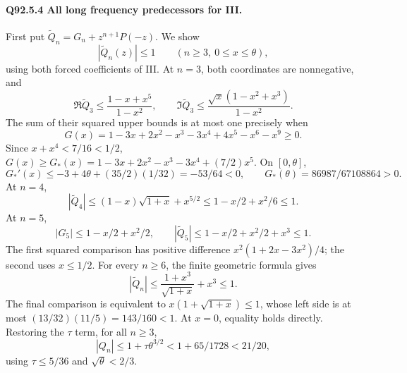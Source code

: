 \paragraph{Q92.5.4 All long frequency predecessors for III.}
First put \(\widetilde Q_n=\allowbreak G_n+z^{n+1}P(-z)\). We show
\begin{equation}\tag{Q92.5.13}\label{eq:Q92:5.13}
|\widetilde Q_n(z)|\le1\qquad(n\ge3,\ 0\le x\le\theta),
\end{equation}
using both forced coefficients of III.
At \(n=\allowbreak 3\), both coordinates are nonnegative, and
\begin{equation}\tag{Q92.5.14}\label{eq:Q92:5.14}
\Re\widetilde Q_3\le\frac{1-x+x^5}{1-x^2},\qquad
\Im\widetilde Q_3\le\frac{\sqrt x(1-x^2+x^3)}{1-x^2}.
\end{equation}
The sum of their squared upper bounds is at most one precisely when
\begin{equation}\tag{Q92.5.15}\label{eq:Q92:5.15}
G(x)=1-3x+2x^2-x^3-3x^4+4x^5-x^6-x^9\ge0.
\end{equation}
Since \(x+x^4<\allowbreak 7/16<\allowbreak 1/2\),
\(G(x)\ge\allowbreak  G_*(x)=\allowbreak 1-3x+2x^2-x^3-3x^4+(7/2)x^5\).
On \([0,\allowbreak \theta]\),
\begin{equation}\tag{Q92.5.16}\label{eq:Q92:5.16}
G_*'(x)\le-3+4\theta+(35/2)(1/32)=-53/64<0,
\qquad G_*(\theta)=86987/67108864>0.
\end{equation}
At \(n=\allowbreak 4\),
\begin{equation}\tag{Q92.5.17}\label{eq:Q92:5.17}
|\widetilde Q_4|\le(1-x)\sqrt{1+x}+x^{5/2}
\le1-x/2+x^2/6\le1.
\end{equation}
At \(n=\allowbreak 5\),
\begin{equation}\tag{Q92.5.18}\label{eq:Q92:5.18}
|G_5|\le1-x/2+x^2/2,\qquad
|\widetilde Q_5|\le1-x/2+x^2/2+x^3\le1.
\end{equation}
The first squared comparison has positive difference
\(x^2(1+2x-3x^2)/4\); the second uses \(x\le\allowbreak 1/2\).
For every \(n\ge\allowbreak 6\), the finite geometric formula gives
\begin{equation}\tag{Q92.5.19}\label{eq:Q92:5.19}
|\widetilde Q_n|\le\frac{1+x^3}{\sqrt{1+x}}+x^3\le1.
\end{equation}
The final comparison is equivalent to \(x(1+\sqrt{1+x})\le\allowbreak 1\), whose
left side is at most \((13/32)(11/5)=\allowbreak 143/160<\allowbreak 1\).
At \(x=\allowbreak 0\), equality holds directly.
Restoring the \(\tau\) term, for all \(n\ge\allowbreak 3\),
\begin{equation}\tag{Q92.5.20}\label{eq:Q92:5.20}
|Q_n|\le1+\tau\theta^{3/2}<1+65/1728<21/20,
\end{equation}
using \(\tau\le\allowbreak 5/36\) and \(\sqrt\theta<\allowbreak 2/3\).

